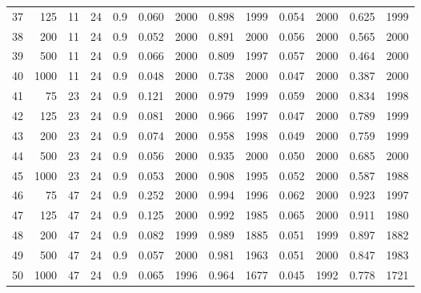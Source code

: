 \documentclass{article}
\begin{document}
\begin{table}[ht]
\begin{center}
\begin{tabular}{rrrrrrrrrrrrr}
  37 & 125 & 11 & 24 & 0.9 & 0.060 & 2000 & 0.898 & 1999 & 0.054 & 2000 & 0.625 & 1999 \\ 
  38 & 200 & 11 & 24 & 0.9 & 0.052 & 2000 & 0.891 & 2000 & 0.056 & 2000 & 0.565 & 2000 \\ 
  39 & 500 & 11 & 24 & 0.9 & 0.066 & 2000 & 0.809 & 1997 & 0.057 & 2000 & 0.464 & 2000 \\ 
  40 & 1000 & 11 & 24 & 0.9 & 0.048 & 2000 & 0.738 & 2000 & 0.047 & 2000 & 0.387 & 2000 \\ 
   \hline
41 & 75 & 23 & 24 & 0.9 & 0.121 & 2000 & 0.979 & 1999 & 0.059 & 2000 & 0.834 & 1998 \\ 
  42 & 125 & 23 & 24 & 0.9 & 0.081 & 2000 & 0.966 & 1997 & 0.047 & 2000 & 0.789 & 1999 \\ 
  43 & 200 & 23 & 24 & 0.9 & 0.074 & 2000 & 0.958 & 1998 & 0.049 & 2000 & 0.759 & 1999 \\ 
  44 & 500 & 23 & 24 & 0.9 & 0.056 & 2000 & 0.935 & 2000 & 0.050 & 2000 & 0.685 & 2000 \\ 
  45 & 1000 & 23 & 24 & 0.9 & 0.053 & 2000 & 0.908 & 1995 & 0.052 & 2000 & 0.587 & 1988 \\ 
   \hline
46 & 75 & 47 & 24 & 0.9 & 0.252 & 2000 & 0.994 & 1996 & 0.062 & 2000 & 0.923 & 1997 \\ 
  47 & 125 & 47 & 24 & 0.9 & 0.125 & 2000 & 0.992 & 1985 & 0.065 & 2000 & 0.911 & 1980 \\ 
  48 & 200 & 47 & 24 & 0.9 & 0.082 & 1999 & 0.989 & 1885 & 0.051 & 1999 & 0.897 & 1882 \\ 
  49 & 500 & 47 & 24 & 0.9 & 0.057 & 2000 & 0.981 & 1963 & 0.051 & 2000 & 0.847 & 1983 \\ 
  50 & 1000 & 47 & 24 & 0.9 & 0.065 & 1996 & 0.964 & 1677 & 0.045 & 1992 & 0.778 & 1721 \\ 
   \hline
\end{tabular}
\end{center}
\end{table}
\end{document}
